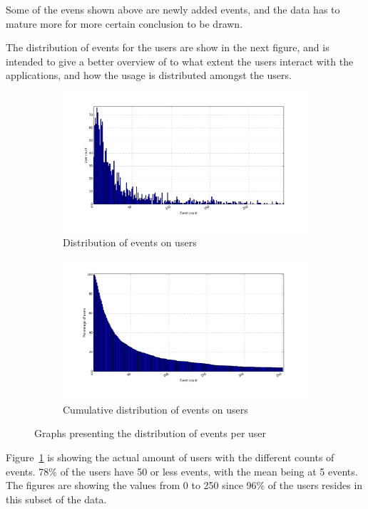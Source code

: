        Some of the evens shown above are newly added events, and the data has to mature more for more certain conclusion to be drawn.

        The distribution of events for the users are show in the next figure, and is intended to give a better overview of to what extent the users interact with the applications, and how the usage is distributed amongst the users.

    \begin{figure}[H]
        \centering
        \begin{subfigure}{.5\textwidth}
            \centering
            \includegraphics[width=\dualGraphWidth]{image/user_iddistribution.png}
            \caption{Distribution of events on users}
    \label{figure:userEventDist}
        \end{subfigure}%
        \begin{subfigure}{.5\textwidth}
            \centering
            \includegraphics[width=\dualGraphWidth]{image/user_idcumdistribution.png}
            \caption{Cumulative distribution of events on users}
    \label{figure:userEventCumDist}
        \end{subfigure}
        \caption{Graphs presenting the distribution of events per user}
    \end{figure}
        Figure~\ref{figure:userEventDist} is showing the actual amount of users with the different counts of events.
        78\% of the users have 50 or less events, with the mean being at 5 events.
        The figures are showing the values from 0 to 250 since 96\% of the users resides in this subset of the data.

